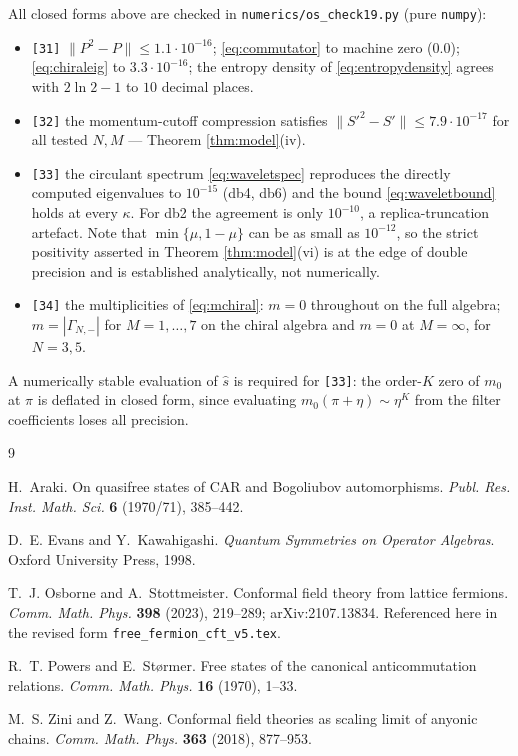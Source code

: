 \documentclass[11pt,a4paper]{article}
\theoremstyle{definition}
\newcommand{\1}{\mathds{1}}
\newcommand{\Gam}{\Gamma}
\begin{document}
All closed forms above are checked in \texttt{numerics/os\_check19.py} (pure \texttt{numpy}):
\begin{itemize}
\item \texttt{[31]} $\|P^{2}-P\|\leq1.1\cdot10^{-16}$; \eqref{eq:commutator} to machine zero
($0.0$); \eqref{eq:chiraleig} to $3.3\cdot10^{-16}$; the entropy density of \eqref{eq:entropydensity}
agrees with $2\ln2-1$ to $10$ decimal places.
\item \texttt{[32]} the momentum-cutoff compression satisfies $\|S'^{2}-S'\|\leq7.9\cdot10^{-17}$ for
all tested $N,M$ --- Theorem \ref{thm:model}(iv).
\item \texttt{[33]} the circulant spectrum \eqref{eq:waveletspec} reproduces the directly computed
eigenvalues to $10^{-15}$ (db4, db6) and the bound \eqref{eq:waveletbound} holds at every $\kappa$.
For db2 the agreement is only $10^{-10}$, a replica-truncation artefact. Note that
$\min\{\mu,1-\mu\}$ can be as small as $10^{-12}$, so the strict positivity asserted in Theorem
\ref{thm:model}(vi) is at the edge of double precision and is established analytically, not
numerically.
\item \texttt{[34]} the multiplicities of \eqref{eq:mchiral}: $m=0$ throughout on the full algebra;
$m=|\Gam_{N,-}|$ for $M=1,\dots,7$ on the chiral algebra and $m=0$ at $M=\infty$, for
$N=3,5$.
\end{itemize}
A numerically stable evaluation of $\hat{s}$ is required for \texttt{[33]}: the order-$K$ zero of
$m_{0}$ at $\pi$ is deflated in closed form, since evaluating $m_{0}(\pi+\eta)\sim\eta^{K}$ from the
filter coefficients loses all precision.

\begin{thebibliography}{9}

H.~Araki.
\newblock On quasifree states of CAR and Bogoliubov automorphisms.
\newblock \emph{Publ. Res. Inst. Math. Sci.} \textbf{6} (1970/71), 385--442.

D.~E. Evans and Y.~Kawahigashi.
\newblock \emph{Quantum Symmetries on Operator Algebras}.
\newblock Oxford University Press, 1998.

T.~J. Osborne and A.~Stottmeister.
\newblock Conformal field theory from lattice fermions.
\newblock \emph{Comm. Math. Phys.} \textbf{398} (2023), 219--289; arXiv:2107.13834.
\newblock Referenced here in the revised form \texttt{free\_fermion\_cft\_v5.tex}.

R.~T. Powers and E.~St\o rmer.
\newblock Free states of the canonical anticommutation relations.
\newblock \emph{Comm. Math. Phys.} \textbf{16} (1970), 1--33.

M.~S. Zini and Z.~Wang.
\newblock Conformal field theories as scaling limit of anyonic chains.
\newblock \emph{Comm. Math. Phys.} \textbf{363} (2018), 877--953.

\end{thebibliography}
\end{document}
